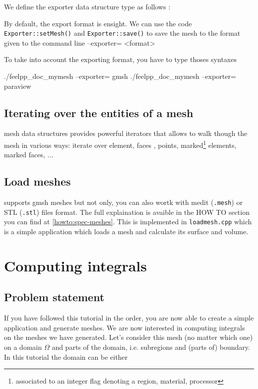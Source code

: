 We define the exporter data structure type as follows :


By default, the  export format is ensight. We can use the code \lstinline!Exporter::setMesh()! and \lstinline!Exporter::save()! to save the mesh to the format given to the command line --exporter= <format>



To take into account the exporting format, you have to type thoses syntaxes
\begin{unixcom}
		./feelpp_doc_mymesh  --exporter= gmsh
		./feelpp_doc_mymesh  --exporter= paraview
\end{unixcom}


\subsection{Iterating over the entities of a mesh}

\feel mesh data structures provides powerful iterators that allows to
walk though the mesh in various ways: iterate over element, faces ,
points, marked\footnote{associated to an integer flag denoting a
  region, material, processor} elements, marked faces, ...

\subsection{Load meshes}

\feel supports gmsh meshes but not only, you can also wortk with medit (\lstinline!.mesh!) or STL (\lstinline!.stl!) files format. The full explaination is avaible in the HOW TO section you can find at \ref{howto:spec-meshes}. This is implemented in \lstinline!loadmesh.cpp! which is a simple application which loads a mesh and calculate its surface and volume.

\section{Computing integrals}
\label{sec:computing-integrals}

\subsection{Problem statement}

If you have followed this tutorial in the order, you are now able to create a simple application and generate meshes. We are now interested in computing integrals on the meshes we have generated. Let's consider this mesh (no matter which one) on a domain $\Omega$ and parts of the domain, i.e. subregions and (parts of) boundary. In this tutorial the domain can be either

